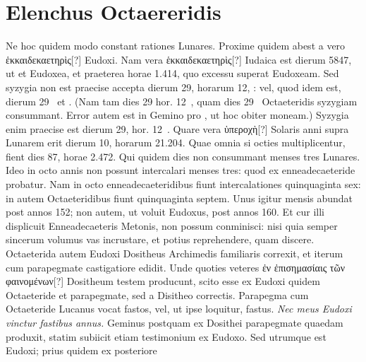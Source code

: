 \section{Elenchus Octaereridis}
%
Ne hoc quidem modo constant rationes Lunares.
Proxime
quidem abest a vero \textgreek{ἑκκαιδεκαετηρὶς[?]} Eudoxi.
Nam vera \textgreek{ἑκκαιδεκαετηρὶς[?]}
Iudaica est dierum 5847, ut et Eudoxea, et praeterea
horae 1.414, quo excessu superat Eudoxeam.
Sed syzygia non est praecise
accepta dierum 29, horarum 12, : vel, quod idem est,
 dierum 29~
et .
(Nam tam dies 29 hor. 12~, quam dies 29~
  Octaeteridis syzygiam
consummant.
Error autem est in Gemino
 pro
 ,
  ut hoc obiter
moneam.)
Syzygia enim praecise est dierum 29, hor. 12~.
Quare
vera \textgreek{ὑπεροχὴ[?]} Solaris anni supra Lunarem erit
 dierum 10, horarum 21.204.
Quae omnia si octies multiplicentur, fient dies 87, horae 2.472.
Qui quidem dies non consummant menses tres Lunares.
Ideo in octo
annis non possunt intercalari menses tres: quod ex enneadecaeteride
probatur.
Nam in octo enneadecaeteridibus fiunt intercalationes
quinquaginta sex: in  autem Octaeteridibus fiunt quinquaginta
septem.
Unus igitur mensis abundat post annos 152; non autem, ut
voluit Eudoxus, post annos 160.
Et cur illi displicuit Enneadecaeteris
Metonis, non possum conminisci: nisi quia semper sincerum volumus
vas incrustare, et potius reprehendere, quam discere.
Octaeterida autem
Eudoxi Dositheus Archimedis familiaris correxit, et iterum cum
parapegmate castigatiore edidit.
Unde quoties veteres \textgreek{ἐν ἐπισημασίαις τῶν φαινομένων[?]}
Dositheum testem producunt, scito esse ex Eudoxi
quidem Octaeteride et parapegmate, sed a Disitheo correctis.
Parapegma
cum Octaeteride Lucanus vocat fastos, vel, ut ipse loquitur, fastus.
\textit{Nec meus Eudoxi vinctur fastibus annus.}
Geminus postquam ex
Dosithei parapegmate quaedam produxit, statim subiicit etiam testimonium
ex Eudoxo.
Sed utrumque est Eudoxi; prius quidem ex posteriore
